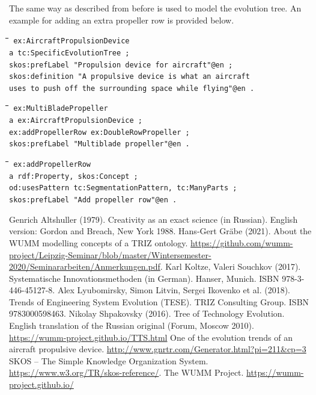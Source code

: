 \documentclass[11pt,a4paper]{article}
\newenvironment{code}{\tt \begin{tabbing}
\hskip12pt\=\hskip12pt\=\hskip12pt\=\hskip12pt\=\hskip5cm\=\hskip5cm\=\kill}
{\end{tabbing}}
\begin{document}
The same way as described from before is used to model the evolution tree. An example for adding an extra propeller row is provided below.

\begin{code}\tt
ex:AircraftPropulsionDevice \\
\> a tc:SpecificEvolutionTree ; \\
\> skos:prefLabel "Propulsion device for aircraft"@en ; \\
\> skos:definition "A propulsive device is what an aircraft \\
\>\> uses to push off the surrounding space while flying"@en .
\end{code}
\begin{code}\tt
ex:MultiBladePropeller \\
\> a ex:AircraftPropulsionDevice ; \\
\> ex:addPropellerRow ex:DoubleRowPropeller ; \\
\> skos:prefLabel "Multiblade propeller"@en .
\end{code}
\begin{code}\tt
ex:addPropellerRow \\
\> a rdf:Property, skos:Concept ; \\
\> od:usesPattern tc:SegmentationPattern, tc:ManyParts ; \\
\> skos:prefLabel "Add propeller row"@en .
\end{code}

\begin{thebibliography}{xxx}
\raggedright
{} Genrich Altshuller (1979).  Creativity as an exact
  science (in Russian). English version: Gordon and Breach, New York 1988.
 Hans-Gert Gr\"abe (2021). About the WUMM modelling
  concepts of a TRIZ ontology.  \url{https://github.com/wumm-project/Leipzig-Seminar/blob/master/Wintersemester-2020/Seminararbeiten/Anmerkungen.pdf}.
 Karl Koltze, Valeri Souchkov (2017).  Systematische
  Innovationsmethoden (in German).  Hanser, Munich. ISBN 978-3-446-45127-8.
 Alex Lyubomirsky, Simon Litvin, Sergei Ikovenko et al.
  (2018). Trends of Engineering System Evolution (TESE).  TRIZ Consulting
  Group. ISBN 9783000598463.
 Nikolay Shpakovsky (2016). Tree of Technology
  Evolution. English translation of the Russian original (Forum, Moscow
  2010).\\ \url{https://wumm-project.github.io/TTS.html}
 One of the evolution trends of an aircraft propulsive device. \url{http://www.gnrtr.com/Generator.html?pi=211&cp=3}
 SKOS -- The Simple Knowledge Organization System.
  \url{https://www.w3.org/TR/skos-reference/}.  
 The WUMM Project. \url{https://wumm-project.github.io/} 
\end{thebibliography}
\end{document}
